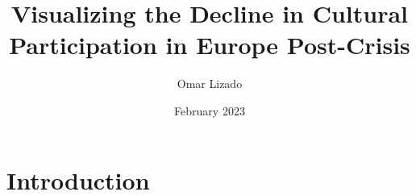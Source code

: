 \documentclass{article}
\title{Visualizing the Decline in Cultural Participation in Europe Post-Crisis}
\author{Omar Lizado}
\date{February 2023}
\begin{document}
\maketitle

\section{Introduction}
\end{document}
